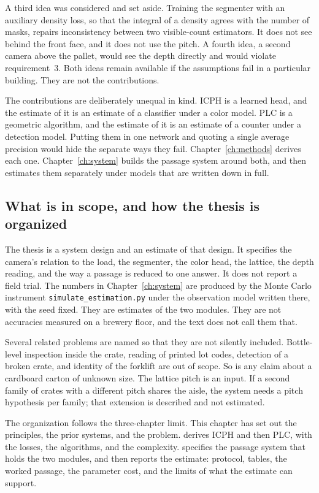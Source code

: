 A third idea was considered and set aside. Training the segmenter with an auxiliary density loss, so that the integral of a density agrees with the number of masks, repairs inconsistency between two visible-count estimators. It does not see behind the front face, and it does not use the pitch. A fourth idea, a second camera above the pallet, would see the depth directly and would violate requirement~3. Both ideas remain available if the assumptions fail in a particular building. They are not the contributions.

The contributions are deliberately unequal in kind. ICPH is a learned head, and the estimate of it is an estimate of a classifier under a color model. PLC is a geometric algorithm, and the estimate of it is an estimate of a counter under a detection model. Putting them in one network and quoting a single average precision would hide the separate ways they fail. Chapter~\ref{ch:methods} derives each one. Chapter~\ref{ch:system} builds the passage system around both, and then estimates them separately under models that are written down in full.

\subsection{What is in scope, and how the thesis is organized}
\label{sec:scope}

The thesis is a system design and an estimate of that design. It specifies the camera's relation to the load, the segmenter, the color head, the lattice, the depth reading, and the way a passage is reduced to one answer. It does not report a field trial. The numbers in Chapter~\ref{ch:system} are produced by the Monte Carlo instrument \texttt{simulate\_estimation.py} under the observation model written there, with the seed fixed. They are estimates of the two modules. They are not accuracies measured on a brewery floor, and the text does not call them that.

Several related problems are named so that they are not silently included. Bottle-level inspection inside the crate, reading of printed lot codes, detection of a broken crate, and identity of the forklift are out of scope. So is any claim about a cardboard carton of unknown size. The lattice pitch is an input. If a second family of crates with a different pitch shares the aisle, the system needs a pitch hypothesis per family; that extension is described and not estimated.

The organization follows the three-chapter limit. This chapter has set out the principles, the prior systems, and the problem.  derives ICPH and then PLC, with the losses, the algorithms, and the complexity.  specifies the passage system that holds the two modules, and then reports the estimate: protocol, tables, the worked passage, the parameter cost, and the limits of what the estimate can support.

